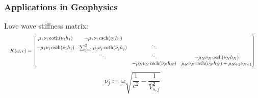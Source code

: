 \documentclass[xcolor=svgnames]{beamer}
\begin{document}
\begin{frame}
    \frametitle{Applications in Geophysics}
    Love wave stiffness matrix:\vfill
    \[
        \resizebox{\textwidth}{!}{$
        K(\omega, c) = \begin{bmatrix}
            \mu_1 \nu_1 \coth(\nu_1 h_1) & -\mu_1 \nu_1 \operatorname{csch}(\nu_1 h_1) & & \\
            -\mu_1 \nu_1 \operatorname{csch}(\nu_1 h_1) & \sum_{j = 1}^{2} \mu_j \nu_j \coth(\nu_j h_j) & \ddots & \\
            & \ddots & \ddots & -\mu_N \nu_N \operatorname{csch}(\nu_N h_N) \\
            & & -\mu_N \nu_N \operatorname{csch}(\nu_N h_N) & \mu_N \nu_N \coth(\nu_N h_N) + \mu_{N + 1} \nu_{N + 1}
        \end{bmatrix}
        $}
    \]
    \vfill
    \[
        \nu_j \coloneqq \omega \sqrt{\frac{1}{c^2} - \frac{1}{V_{s, j}^2}}
    \]
\end{frame}
\end{document}
